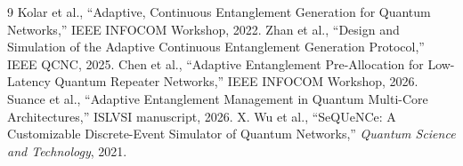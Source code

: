 \documentclass[11pt,a4paper]{report}
\begin{document}
\begin{thebibliography}{9}
Kolar et al., ``Adaptive, Continuous Entanglement Generation for Quantum
Networks,'' IEEE INFOCOM Workshop, 2022.
Zhan et al., ``Design and Simulation of the Adaptive Continuous Entanglement
Generation Protocol,'' IEEE QCNC, 2025.
Chen et al., ``Adaptive Entanglement Pre-Allocation for Low-Latency Quantum
Repeater Networks,'' IEEE INFOCOM Workshop, 2026.
Suance et al., ``Adaptive Entanglement Management in Quantum Multi-Core
Architectures,'' ISLVSI manuscript, 2026.
X. Wu et al., ``SeQUeNCe: A Customizable Discrete-Event Simulator of Quantum
Networks,'' \emph{Quantum Science and Technology}, 2021.
\end{thebibliography}
\end{document}
